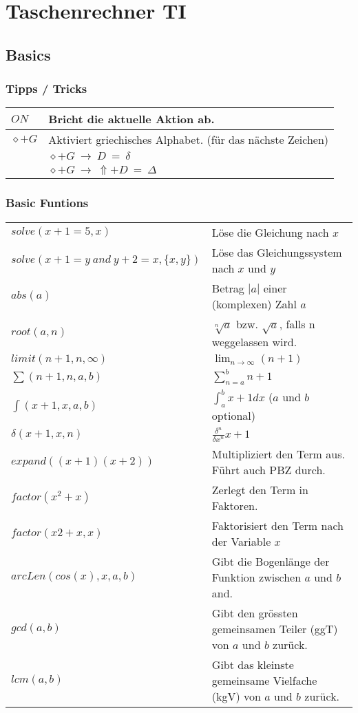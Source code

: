 \section{Taschenrechner TI}
\subsection{Basics}

\subsubsection{Tipps / Tricks}
\begin{tabular}{|l|l|}
	\hline
	$ON$			& Bricht die aktuelle Aktion ab. \\ \hline
	$\diamond + G$	& Aktiviert griechisches Alphabet. (für das nächste Zeichen) \\
					& $\diamond+G \: \to \: D \: = \: \delta$ \\
					& $\diamond+G \: \to \: \Uparrow+D \: = \: \Delta$ \\ \hline
\end{tabular}

\subsubsection{Basic Funtions}
\begin{tabular}{|l|l|}
	\hline
	$solve(x+1=5,x)$									& Löse die Gleichung nach $x$											\\
	$solve(x+1=y \: and \: y+2=x,\{x,y\})$				& Löse das Gleichungssystem nach $x$ und $y$							\\ \hline
	$abs(a)$ 											& Betrag  $|a|$ einer (komplexen) Zahl $a$								\\ \hline
	$root(a,n)$											& $\sqrt[n]{a}$ bzw. $\sqrt{a}$, falls n weggelassen wird.				\\ \hline
	$limit(n+1,n,\infty)$								& $\lim_{n \to \infty}(n+1)$											\\ \hline
	$\sum(n+1,n,a,b)$									& $\sum_{n=a}^b n+1$													\\ \hline
	$\int(x+1,x,a,b)$									& $\int_{a}^b x+1 dx$ ($a$ und $b$ optional)							\\ \hline
	$\delta(x+1,x,n)$									& $\frac{\delta^n}{\delta x^n} x+1$										\\ \hline
	$expand((x+1)(x+2))$								& Multipliziert den Term aus. Führt auch PBZ durch.						\\ \hline
	$factor(x^2+x)$										& Zerlegt den Term in Faktoren.											\\ 
	$factor(x2 +x,x)$									& Faktorisiert den Term nach der Variable $x$							\\ \hline
	$arcLen(cos(x),x,a,b)$								& Gibt die Bogenlänge der Funktion zwischen $a$ und $b$ and. \\ \hline
	$gcd(a,b)$											& Gibt den grössten gemeinsamen Teiler (ggT) von $a$ und $b$ zurück.	\\ \hline
	$lcm(a,b)$											& Gibt das kleinste gemeinsame Vielfache (kgV) von $a$ und $b$ zurück.	\\ \hline
\end{tabular}

